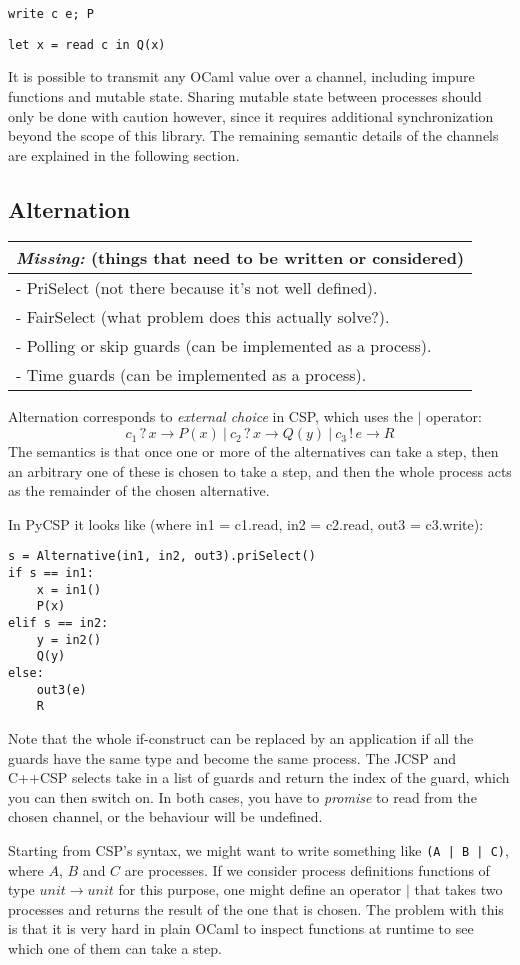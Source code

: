\documentclass[a4paper,12pt]{article}
\newcommand{\missing}[1]{
\begin{tabular}{|p{11cm}|}
\hline
\emph{Missing:} {\scriptsize (things that need to be written or considered)} \\
\hline
#1
\hline
\end{tabular}
}
\begin{document}
\begin{verbatim}
write c e; P
\end{verbatim}
\begin{verbatim}
let x = read c in Q(x)
\end{verbatim}

It is possible to transmit any OCaml value over a channel, including impure functions and mutable 
state. Sharing mutable state between processes should only be done with caution however, since it 
requires additional synchronization beyond the scope of this library. The remaining semantic 
details of the channels are explained in the following section.

\subsection{Alternation}
\missing{
- PriSelect (not there because it's not well defined).\\
- FairSelect (what problem does this actually solve?).\\
- Polling or skip guards (can be implemented as a process). \\
- Time guards (can be implemented as a process). \\
}

Alternation corresponds to \emph{external choice} in CSP, which uses the $|$ operator:
\[c_1\,?\,x \to P(x)\ |\ c_2\,?\,x \to Q(y)\ |\ c_3\,!\,e \to R\]
The semantics is that once one or more of the alternatives can take a step, then
an arbitrary one of these is chosen to take a step, and then the whole process acts as 
the remainder of the chosen alternative.

In PyCSP it looks like (where in1 = c1.read, in2 = c2.read, out3 = c3.write):
\begin{verbatim}
s = Alternative(in1, in2, out3).priSelect()
if s == in1:
    x = in1()
    P(x)
elif s == in2:
    y = in2()
    Q(y)
else:
    out3(e)
    R
\end{verbatim}

Note that the whole if-construct can be replaced by an application if all the guards have the same type 
and become the same process. The JCSP and C++CSP selects take in a list of guards and return the index
of the guard, which you can then switch on. In both cases, you have to \emph{promise} to read from the
chosen channel, or the behaviour will be undefined.

Starting from CSP's syntax, we might want to write something like \texttt{(A | B | C)}, where $A$, $B$
and $C$ are processes. If we consider process definitions functions of type $unit \to unit$ for this 
purpose, one might define an operator $|$ that takes two processes and returns the result of the one that 
is chosen. The problem with this is that it is very hard in plain OCaml to inspect functions at runtime 
to see which one of them can take a step.
\end{document}
